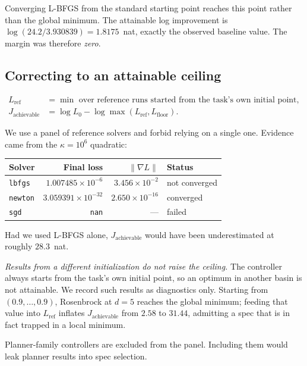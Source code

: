 Converging L-BFGS from the standard starting point reaches this point rather than
the global minimum. The attainable log improvement is
$\log(24.2 / 3.930839) = 1.8175$~nat, exactly the observed baseline value. The
margin was therefore \emph{zero}.

\subsection{Correcting to an attainable ceiling}

\begin{align}
  L_{\text{ref}} &= \min \text{ over reference runs started from the task's own
    initial point}, \\
  J_{\text{achievable}} &= \log L_0 - \log \max(L_{\text{ref}}, L_{\text{floor}}).
\end{align}

We use a panel of reference solvers and forbid relying on a single one. Evidence
came from the $\kappa = 10^6$ quadratic:

\begin{center}
\begin{tabular}{lrrl}
\toprule
Solver & Final loss & $\lVert \nabla L \rVert$ & Status \\
\midrule
\texttt{lbfgs}  & $1.007485 \times 10^{-6}$  & $3.456 \times 10^{-2}$  & not converged \\
\texttt{newton} & $3.059391 \times 10^{-32}$ & $2.650 \times 10^{-16}$ & converged \\
\texttt{sgd}    & \texttt{nan}               & ---                     & failed \\
\bottomrule
\end{tabular}
\end{center}

Had we used L-BFGS alone, $J_{\text{achievable}}$ would have been underestimated
at roughly $28.3$~nat.

\emph{Results from a different initialization do not raise the ceiling.} The
controller always starts from the task's own initial point, so an optimum in
another basin is not attainable. We record such results as diagnostics only.
Starting from $(0.9, \ldots, 0.9)$, Rosenbrock at $d = 5$ reaches the global
minimum; feeding that value into $L_{\text{ref}}$ inflates
$J_{\text{achievable}}$ from $2.58$ to $31.44$, admitting a spec that is in fact
trapped in a local minimum.

Planner-family controllers are excluded from the panel. Including them would leak
planner results into spec selection.

